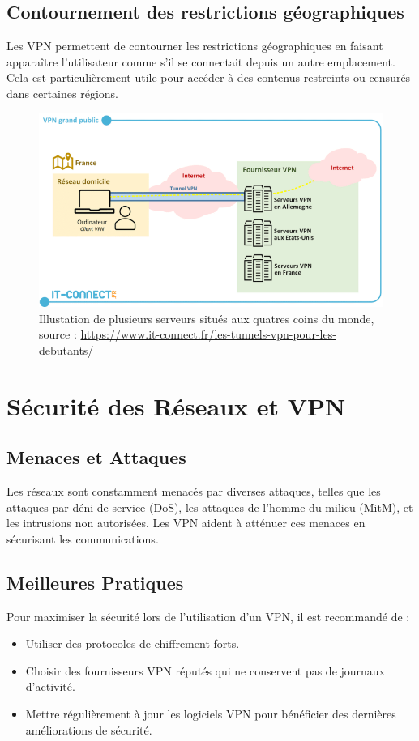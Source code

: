 \documentclass{report}
\begin{document}
\break\section{Contournement des restrictions géographiques}
Les VPN permettent de contourner les restrictions géographiques en faisant apparaître l'utilisateur comme s'il se connectait depuis un autre emplacement. Cela est particulièrement utile pour accéder à des contenus restreints ou censurés dans certaines régions.

\begin{figure}[H]
  \centering
  \includegraphics[width=1\textwidth]{img/localisation.png}
  \caption{Illustation de plusieurs serveurs situés aux quatres coins du monde, source : \url{https://www.it-connect.fr/les-tunnels-vpn-pour-les-debutants/}}
\end{figure}

\chapter{Sécurité des Réseaux et VPN}
\section{Menaces et Attaques}
Les réseaux sont constamment menacés par diverses attaques, telles que les attaques par déni de service (DoS), les attaques de l'homme du milieu (MitM), et les intrusions non autorisées. Les VPN aident à atténuer ces menaces en sécurisant les communications.

\section{Meilleures Pratiques}
Pour maximiser la sécurité lors de l'utilisation d'un VPN, il est recommandé de :
\begin{itemize}
  \item Utiliser des protocoles de chiffrement forts.
  \item Choisir des fournisseurs VPN réputés qui ne conservent pas de journaux d'activité.
  \item Mettre régulièrement à jour les logiciels VPN pour bénéficier des dernières améliorations de sécurité.
\end{itemize}
\end{document}
